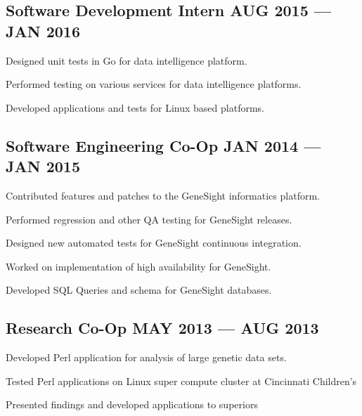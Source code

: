 \subsection{{Software Development Intern \hfill AUG 2015 --- JAN 2016}}
\begin{zitemize}
\item Designed unit tests in Go for data intelligence platform.
\item Performed testing on various services for data intelligence platforms.
\item Developed applications and tests for Linux based platforms.
\end{zitemize}

\subsection{{Software Engineering Co-Op \hfill JAN 2014 --- JAN 2015}}
\begin{zitemize}
\item Contributed features and patches to the GeneSight informatics platform.
\item Performed regression and other QA testing for GeneSight releases.
\item Designed new automated tests for GeneSight continuous integration.
\item Worked on implementation of high availability for GeneSight.
\item Developed SQL Queries and schema for GeneSight databases.
\end{zitemize}

\subsection{{Research Co-Op \hfill MAY 2013 --- AUG 2013}}
\begin{zitemize}
\item Developed Perl application for analysis of large genetic data sets.
\item Tested Perl applications on Linux super compute cluster at Cincinnati Children's
\item Presented findings and developed applications to superiors
\end{zitemize}